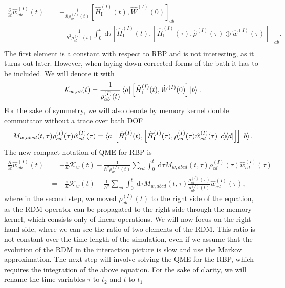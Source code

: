\begin{equation}
    \begin{aligned}
    \frac{\partial}{\partial t} \hat{w}^{(I)}_{ab}(t)
    &=-\frac{i}{\hbar \rho^{(I)}_{ab}(t)} \left[\hat{H}_{\mathrm{I}}^{(I)}(t), \hat{W}^{(I)}(0)\right]_{ab} \\
    &\quad-\frac{1}{\hbar^{2} \rho^{(I)}_{ab}(t)} \int_{0}^{t} \mathrm{~d} \tau \left[\hat{H}_{\mathrm{I}}^{(I)}(t),\left[\hat{H}_{\mathrm{I}}^{(I)}(\tau), \hat{\rho}^{(I)}(\tau) \oplus \hat{w}^{(I)}(\tau)\right]\right]_{ab}. \\
    \end{aligned}
\end{equation}
The first element is a constant with respect to RBP and is not interesting, as it turns out later. However, when laying down corrected forms of the bath it has to be included. We will denote it with 
\begin{equation}
    \mathcal{K}_{w,ab}(t) = \frac{1}{\rho^{(I)}_{ab}(t)} \bra{a}\left[\hat{H}_{\mathrm{I}}^{(I)}(t), \hat{W}^{(I)}(0)\right]\ket{b}.
\end{equation}
For the sake of symmetry, we will also denote by memory kernel double commutator without a trace over bath DOF
\begin{equation}
    M_{w, abcd} (t, \tau) \rho^{(I)}_{cd}(\tau) \hat{w}^{(I)}_{cd}(\tau) = \bra{a} \left[\hat{H}_{\mathrm{I}}^{(I)}(t),\left[\hat{H}_{\mathrm{I}}^{(I)}(\tau), \rho^{(I)}_{cd}(\tau) \hat{w}^{(I)}_{cd}(\tau) \ketbra{c}{d} \right]\right] \ket{b}.
\end{equation}
The new compact notation of QME for RBP is 
\begin{equation}
\label{RBP_diff_eq}
    \begin{aligned}
    \frac{\partial}{\partial t} \hat{w}^{(I)}_{ab}(t)
    &=-\frac{i}{\hbar} \mathcal{K}_w(t) -\frac{1}{\hbar^{2} \rho^{(I)}_{ab}(t)} \sum_{cd} \int_{0}^{t} \mathrm{~d} \tau M_{w, abcd} (t, \tau) \rho^{(I)}_{cd}(\tau) \hat{w}^{(I)}_{cd}(\tau) \\
    &=-\frac{i}{\hbar} \mathcal{K}_w(t) -\frac{1}{\hbar^{2}} \sum_{cd} \int_{0}^{t} \mathrm{~d} \tau M_{w, abcd} (t, \tau) \frac{\rho^{(I)}_{cd}(\tau) }{ \rho^{(I)}_{ab}(t)}\hat{w}^{(I)}_{cd}(\tau), 
    \end{aligned}
\end{equation}
where in the second step, we moved $\rho^{(I)}_{ab}(t)$ to the right side of the equation, as the RDM operator can be propagated to the right side through the memory kernel, which consists only of linear operations. We will now focus on the right-hand side, where we can see the ratio of two elements of the RDM. This ratio is not constant over the time length of the simulation, even if we assume that the evolution of the RDM in the interaction picture is slow and use the Markov approximation. The next step will involve solving the QME for the RBP, which requires the integration of the above equation. For the sake of clarity, we will rename the time variables $\tau$ to $t_2$ and $t$ to $t_1$
